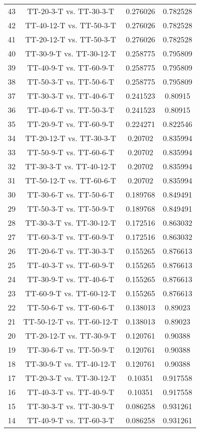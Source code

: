 \documentclass[a4paper,10pt]{article}
\begin{document}
\begin{landscape}
\begin{table}[!htp]
\begin{tabular}{cccc}
43&TT-20-3-T vs. TT-30-3-T&0.276026&0.782528\\
42&TT-40-12-T vs. TT-50-3-T&0.276026&0.782528\\
41&TT-20-12-T vs. TT-50-3-T&0.276026&0.782528\\
40&TT-30-9-T vs. TT-30-12-T&0.258775&0.795809\\
39&TT-40-9-T vs. TT-60-9-T&0.258775&0.795809\\
38&TT-50-3-T vs. TT-50-6-T&0.258775&0.795809\\
37&TT-30-3-T vs. TT-40-6-T&0.241523&0.80915\\
36&TT-40-6-T vs. TT-50-3-T&0.241523&0.80915\\
35&TT-20-9-T vs. TT-60-9-T&0.224271&0.822546\\
34&TT-20-12-T vs. TT-30-3-T&0.20702&0.835994\\
33&TT-50-9-T vs. TT-60-6-T&0.20702&0.835994\\
32&TT-30-3-T vs. TT-40-12-T&0.20702&0.835994\\
31&TT-50-12-T vs. TT-60-6-T&0.20702&0.835994\\
30&TT-30-6-T vs. TT-50-6-T&0.189768&0.849491\\
29&TT-50-3-T vs. TT-50-9-T&0.189768&0.849491\\
28&TT-30-3-T vs. TT-30-12-T&0.172516&0.863032\\
27&TT-60-3-T vs. TT-60-9-T&0.172516&0.863032\\
26&TT-20-6-T vs. TT-30-3-T&0.155265&0.876613\\
25&TT-40-3-T vs. TT-60-9-T&0.155265&0.876613\\
24&TT-30-9-T vs. TT-40-6-T&0.155265&0.876613\\
23&TT-60-9-T vs. TT-60-12-T&0.155265&0.876613\\
22&TT-50-6-T vs. TT-60-6-T&0.138013&0.89023\\
21&TT-50-12-T vs. TT-60-12-T&0.138013&0.89023\\
20&TT-20-12-T vs. TT-30-9-T&0.120761&0.90388\\
19&TT-30-6-T vs. TT-50-9-T&0.120761&0.90388\\
18&TT-30-9-T vs. TT-40-12-T&0.120761&0.90388\\
17&TT-20-3-T vs. TT-30-12-T&0.10351&0.917558\\
16&TT-40-3-T vs. TT-40-9-T&0.10351&0.917558\\
15&TT-30-3-T vs. TT-30-9-T&0.086258&0.931261\\
14&TT-40-9-T vs. TT-60-3-T&0.086258&0.931261\\

\end{tabular}
\end{table}
\end{landscape}
\end{document}
